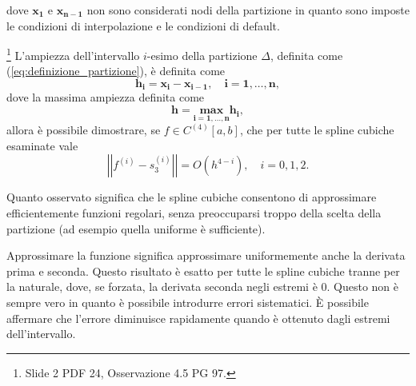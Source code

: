 \addtocounter{footnote}{-3}




\noindent dove $\boldsymbol{x_1}$ e $\boldsymbol{x_{n-1}}$ non sono considerati nodi della partizione in quanto sono imposte le condizioni di interpolazione e le condizioni di default.

\begin{remark}
    \footnote{Slide 2 PDF 24, Osservazione 4.5 PG 97.} L'ampiezza dell'intervallo $i$-esimo della partizione $\Delta$, definita come (\ref{eq:definizione_partizione}), è definita come
    \begin{equation}\label{eq:ampiezza_partizione}
        \boldsymbol{h_i=x_i-x_{i-1},\quad i=1,\hdots,n},
    \end{equation}
    dove la massima ampiezza definita come 
    \begin{equation*}
        \boldsymbol{h=\underset{i=1,\hdots,n}{max}h_i},
    \end{equation*}
    allora è possibile dimostrare, se $f\in C^{(4)}[a,b]$, che per tutte le spline cubiche esaminate vale
    \begin{equation*}
        \left|\left|f^{(i)}-s^{(i)}_3\right|\right|=O\left(h^{4-i}\right),\quad i=0,1,2.
    \end{equation*}
\end{remark}

Quanto osservato significa che le spline cubiche consentono di approssimare efficientemente funzioni regolari, senza preoccuparsi troppo della scelta della partizione (ad esempio quella uniforme è sufficiente).

Approssimare la funzione significa approssimare uniformemente anche la derivata prima e seconda. Questo risultato è esatto per tutte le spline cubiche tranne per la naturale, dove, se forzata, la derivata seconda negli estremi è 0. Questo non è sempre vero in quanto è possibile introdurre errori sistematici. È possibile affermare che l'errore diminuisce rapidamente quando è ottenuto dagli estremi dell'intervallo.

